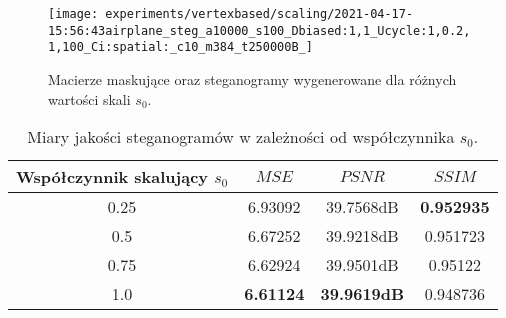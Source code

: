 {{{\begin{figure}
{                    \label{fig:exp-vertex-scale0.75-steg}
                    \texttt{[image: experiments/vertexbased/scaling/2021-04-17-15:56:43airplane\_steg\_a10000\_s100\_Dbiased:1,1\_Ucycle:1,0.2,1,100\_Ci:spatial:\_c10\_m384\_t250000B\_]}
                } \\
                \hspace{8pt}

                \caption[Porównania wizualizacji konwersji oraz macierzy maskujących.]
                {Macierze maskujące oraz steganogramy wygenerowane dla różnych wartości skali $s_0$.}
                \label{fig:exp-vertex-scale}
            \end{figure}

            \begin{table}
                \centering
                \begin{tabular}{ |c|c c c| }
                    \hline
                    Współczynnik skalujący \newline $s_0$ & $MSE$ & $PSNR$ & $SSIM$ \\
                    \hline
                    0.25 & 6.93092 & 39.7568dB & \textbf{0.952935} \\
                    0.5 & 6.67252 & 39.9218dB & 0.951723 \\
                    0.75 & 6.62924 & 39.9501dB & 0.95122 \\
                    1.0 & \textbf{6.61124} & \textbf{39.9619dB} & 0.948736 \\
                    \hline
                \end{tabular}
                \caption{Miary jakości steganogramów w zależności od współczynnika $s_0$.}
                \label{tab:exp-vertex-scale-errors}
            \end{table}

}}}
